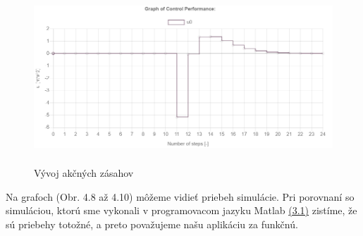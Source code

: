\begin{figure}[H]
	\centering
	\includegraphics[width=13cm,height=6.5cm]{images/Hmotny_bod_apk/u}
	\caption{Vývoj akčných zásahov}
\end{figure}
Na grafoch (Obr. 4.8 až 4.10) môžeme vidieť priebeh simulácie. Pri porovnaní so simuláciou, ktorú sme vykonali v programovacom jazyku Matlab \hyperref[sec:HB]{(3.1)} zistíme, že sú priebehy totožné, a preto považujeme našu aplikáciu za funkčnú. 